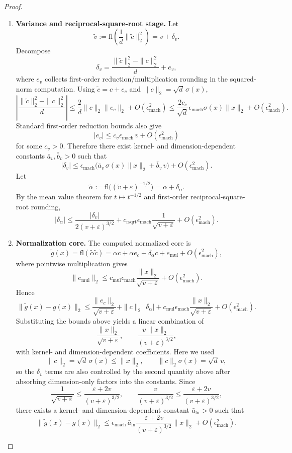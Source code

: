 \documentclass[twoside]{article}
\theoremstyle{definition}
\theoremstyle{remark}
\begin{document}
\begin{proof}
\begin{enumerate}
  \item \textbf{Variance and reciprocal-square-root stage.}
  Let
  \[
  \widetilde{v}:=\mathrm{fl}\!\left(\frac{1}{d}\|\widetilde{c}\|_2^2\right)
  = v+\delta_v.
  \]
  Decompose
  \[
  \delta_v
  =
  \frac{\|\widetilde{c}\|_2^2-\|c\|_2^2}{d}
  + e_v,
  \]
  where $e_v$ collects first-order reduction/multiplication rounding in the
  squared-norm computation. Using $\widetilde{c}=c+e_c$ and
  $\|c\|_2=\sqrt d\,\sigma(x)$,
  \[
  \left|
  \frac{\|\widetilde{c}\|_2^2-\|c\|_2^2}{d}
  \right|
  \le
  \frac{2}{d}\|c\|_2\|e_c\|_2
  + O(\epsilon_{\mathrm{mach}}^2)
  \le
  \frac{2c_c}{\sqrt d}\epsilon_{\mathrm{mach}}\sigma(x)\|x\|_2
  + O(\epsilon_{\mathrm{mach}}^2).
  \]
  Standard first-order reduction bounds also give
  \[
  |e_v|
  \le
  c_v\epsilon_{\mathrm{mach}}\,v
  + O(\epsilon_{\mathrm{mach}}^2)
  \]
  for some $c_v>0$. Therefore there exist kernel- and dimension-dependent
  constants $\bar a_v,\bar b_v>0$ such that
  \[
  |\delta_v|
  \le
  \epsilon_{\mathrm{mach}}
  \bigl(\bar a_v\,\sigma(x)\|x\|_2+\bar b_v\,v\bigr)
  + O(\epsilon_{\mathrm{mach}}^2).
  \]
  Let
  \[
  \widetilde{\alpha}
  :=\mathrm{fl}\!\bigl((\widetilde{v}+\varepsilon)^{-1/2}\bigr)
  =\alpha+\delta_\alpha.
  \]
  By the mean value theorem for $t\mapsto t^{-1/2}$ and first-order
  reciprocal-square-root rounding,
  \[
  |\delta_\alpha|
  \le
  \frac{|\delta_v|}{2(v+\varepsilon)^{3/2}}
  +
  c_{\mathrm{rsqrt}}\epsilon_{\mathrm{mach}}\frac{1}{\sqrt{v+\varepsilon}}
  + O(\epsilon_{\mathrm{mach}}^2).
  \]

  \item \textbf{Normalization core.}
  The computed normalized core is
  \[
  \widetilde{g}(x)
  =
  \mathrm{fl}(\widetilde{\alpha}\widetilde{c})
  =
  \alpha c+\alpha e_c+\delta_\alpha c+e_{\mathrm{mul}}
  + O(\epsilon_{\mathrm{mach}}^2),
  \]
  where pointwise multiplication gives
  \[
  \|e_{\mathrm{mul}}\|_2
  \le
  c_{\mathrm{mul}}\epsilon_{\mathrm{mach}}
  \frac{\|x\|_2}{\sqrt{v+\varepsilon}}
  + O(\epsilon_{\mathrm{mach}}^2).
  \]
  Hence
  \[
  \|\widetilde{g}(x)-g(x)\|_2
  \le
  \frac{\|e_c\|_2}{\sqrt{v+\varepsilon}}
  +
  \|c\|_2\,|\delta_\alpha|
  +
  c_{\mathrm{mul}}\epsilon_{\mathrm{mach}}
  \frac{\|x\|_2}{\sqrt{v+\varepsilon}}
  + O(\epsilon_{\mathrm{mach}}^2).
  \]
  Substituting the bounds above yields a linear combination of
  \[
  \frac{\|x\|_2}{\sqrt{v+\varepsilon}},
  \qquad
  \frac{v\,\|x\|_2}{(v+\varepsilon)^{3/2}},
  \]
  with kernel- and dimension-dependent coefficients. Here we used
  \[
  \|c\|_2=\sqrt d\,\sigma(x)\le \|x\|_2,
  \qquad
  \|c\|_2\sigma(x)=\sqrt d\,v,
  \]
  so the $\delta_v$ terms are also controlled by the second quantity above
  after absorbing dimension-only factors into the constants. Since
  \[
  \frac{1}{\sqrt{v+\varepsilon}}
  \le
  \frac{\varepsilon+2v}{(v+\varepsilon)^{3/2}},
  \qquad
  \frac{v}{(v+\varepsilon)^{3/2}}
  \le
  \frac{\varepsilon+2v}{(v+\varepsilon)^{3/2}},
  \]
  there exists a kernel- and dimension-dependent constant
  $\bar a_{\mathrm{ln}}>0$ such that
  \[
  \|\widetilde{g}(x)-g(x)\|_2
  \le
  \epsilon_{\mathrm{mach}}\,
  \bar a_{\mathrm{ln}}
  \frac{\varepsilon+2v}{(v+\varepsilon)^{3/2}}
  \|x\|_2
  + O(\epsilon_{\mathrm{mach}}^2).
  \]


\end{enumerate}
\end{proof}
\end{document}
